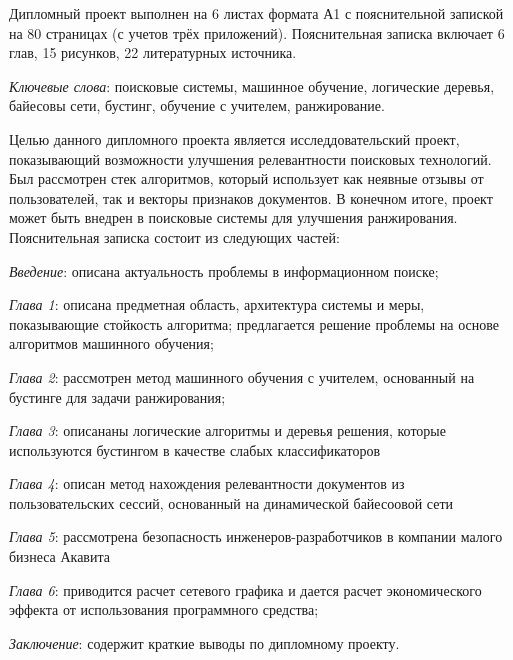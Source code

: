\thispagestyle{empty}

Дипломный проект выполнен на 6 листах формата А1 с пояснительной запиской на 80 страницах (с учетов трёх приложений). Пояснительная записка включает 6 глав, 15 рисунков, 22 литературных источника.

\emph{Ключевые слова}: поисковые системы, машинное обучение, логические деревья, байесовы сети, бустинг, обучение с учителем, ранжирование.


Целью данного дипломного проекта является исследдовательский проект, показывающий возможности улучшения релевантности поисковых технологий. Был рассмотрен стек алгоритмов, который использует как неявные отзывы от пользователей, так и векторы признаков документов. В конечном итоге, проект может быть внедрен в поисковые системы для улучшения ранжирования. Пояснительная записка состоит из следующих частей:

\emph{Введение}: описана актуальность проблемы в информационном поиске;

\emph{Глава 1}: описана предметная область, архитектура системы и меры, показывающие стойкость алгоритма; предлагается решение проблемы на основе алгоритмов машинного обучения;

\emph{Глава 2}: рассмотрен метод машинного обучения с учителем, основанный на бустинге для задачи ранжирования;

\emph{Глава 3}: описананы логические алгоритмы и деревья решения, которые используются бустингом в качестве слабых классификаторов

\emph{Глава 4}: описан метод нахождения релевантности документов из пользовательских сессий, основанный на динамической байесоовой сети

\emph{Глава 5}: рассмотрена безопасность инженеров-разработчиков в компании малого бизнеса Акавита

\emph{Глава 6}: приводится расчет сетевого графика и дается расчет экономического эффекта от использования программного средства;

\emph{Заключение}: содержит краткие выводы по дипломному проекту.

\newpage


